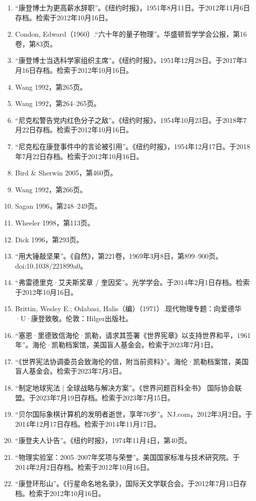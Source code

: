 \begin{enumerate}
\item “康登博士为更高薪水辞职”。《纽约时报》，1951年8月11日。于2012年11月6日存档。检索于2012年10月16日。
\item Condon, Edward（1960）.“六十年的量子物理”。华盛顿哲学学会公报，第16卷，第83页。
\item “康登博士当选科学家组织主席”。《纽约时报》，1951年12月28日。于2017年3月16日存档。检索于2012年10月16日。
\item Wang 1992，第265页。
\item Wang 1992，第264–265页。
\item “尼克松警告党内红色分子之敌”。《纽约时报》，1954年10月23日。于2018年7月22日存档。检索于2012年10月16日。
\item “尼克松在康登事件中的言论被引用”。《纽约时报》，1954年12月17日。于2018年7月22日存档。检索于2012年10月16日。
\item Bird & Sherwin 2005，第460页。
\item Wang 1992，第266页。
\item Sagan 1996，第248–249页。
\item Wheeler 1998，第113页。
\item Dick 1996，第293页。
\item “用大锤敲坚果”。《自然》，第221卷，1969年3月8日，第899–900页。doi:10.1038/221899a0。
\item “弗雷德里克·艾夫斯奖章 / 奎因奖”。光学学会。于2014年2月1日存档。检索于2012年10月16日。
\item Brittin, Wesley E.; Odabasi, Halis（编）（1971）.现代物理专题：向爱德华·U·康登致敬。伦敦：Hilger出版社。
\item “塞恩·里德致信海伦·凯勒，请求其签署《世界宪章》以支持世界和平，1961年”。海伦·凯勒档案馆，美国盲人基金会。检索于2023年7月1日。
\item “《世界宪法协调委员会致海伦的信，附当前资料》”。海伦·凯勒档案馆，美国盲人基金会。检索于2023年7月3日。
\item “制定地球宪法 | 全球战略与解决方案”。《世界问题百科全书》 国际协会联盟。于2023年7月19日存档。检索于2023年7月15日。
\item “贝尔国际象棋计算机的发明者逝世，享年76岁”。NJ.com，2012年3月2日。于2014年12月17日存档。检索于2014年11月17日。
\item “康登夫人讣告”。《纽约时报》，1974年11月4日，第40页。
\item “物理实验室：2005–2007年奖项与荣誉”。美国国家标准与技术研究院。于2014年2月2日存档。检索于2012年10月16日。
\item “康登环形山”。《行星命名地名录》，国际天文学联合会。于2012年7月13日存档。检索于2012年10月16日。

\end{enumerate}
